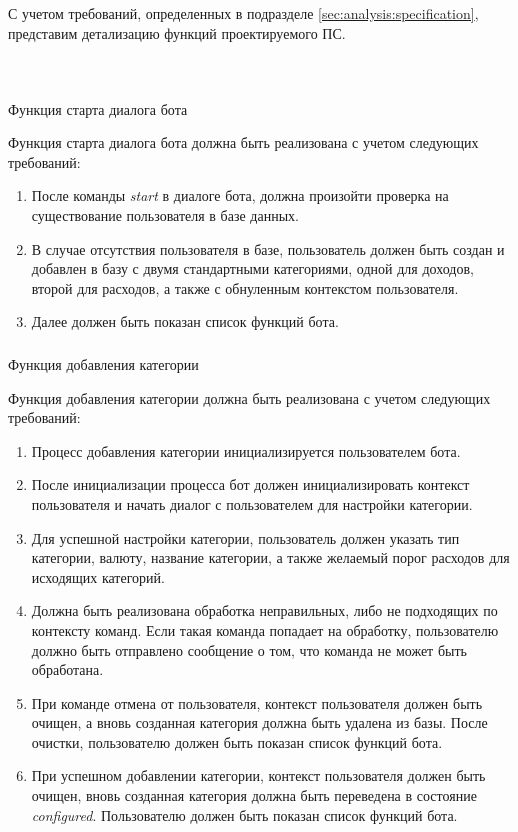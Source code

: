 С учетом требований, определенных в подразделе \ref{sec:analysis:specification}, представим детализацию функций проектируемого ПС.

\\[5cm]
\subsubsection{} Функция старта диалога бота
\label{sec:domain:specification:startdialog}

Функция старта диалога бота должна быть реализована с учетом следующих требований:

\begin{enumerate}
	\item После команды \emph{start} в диалоге бота, должна произойти проверка на существование пользователя в базе данных.
	\item В случае отсутствия пользователя в базе, пользователь должен быть создан и добавлен в базу с двумя стандартными категориями, одной для доходов, второй для расходов, а также с обнуленным контекстом пользователя.
	\item Далее должен быть показан список функций бота.
\end{enumerate}

\subsubsection{} Функция добавления категории
\label{sec:domain:specification:addcategory}

Функция добавления категории должна быть реализована с учетом следующих требований:

\begin{enumerate}
	\item Процесс добавления категории инициализируется пользователем бота.
	\item После инициализации процесса бот должен инициализировать контекст пользователя и начать диалог с пользователем для настройки категории.
	\item Для успешной настройки категории, пользователь должен указать тип категории, валюту, название категории, а также желаемый порог расходов для исходящих категорий.
	\item Должна быть реализована обработка неправильных, либо не подходящих по контексту команд. Если такая команда попадает на обработку, пользователю должно быть отправлено сообщение о том, что команда не может быть обработана.
	\item При команде отмена от пользователя, контекст пользователя должен быть очищен, а вновь созданная категория должна быть удалена из базы. После очистки, пользователю должен быть показан список функций бота.
	\item При успешном добавлении категории, контекст пользователя должен быть очищен, вновь созданная категория должна быть переведена в состояние \emph{configured}. Пользователю должен быть показан список функций бота.
\end{enumerate}

